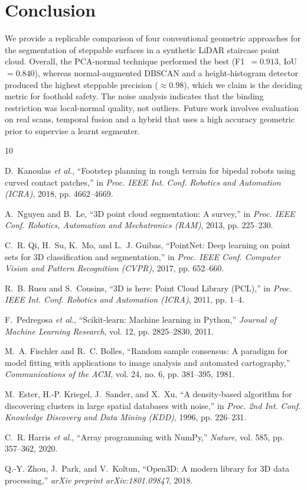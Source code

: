 \documentclass[conference]{IEEEtran}
\begin{document}
\section{Conclusion}
We provide a replicable comparison of four conventional geometric approaches for
the segmentation of steppable surfaces in a synthetic LiDAR staircase point cloud.
Overall, the PCA-normal technique performed the best (F1~$=0.913$, IoU~$=0.840$),
whereas normal-augmented DBSCAN and a height-histogram detector produced the highest
steppable precision ($\approx0.98$), which we claim is the deciding metric for
foothold safety. The noise analysis indicates that the binding restriction was
local-normal quality, not outliers. Future work involves evaluation on real scans,
temporal fusion and a hybrid that uses a high accuracy geometric prior to supervise
a learnt segmenter.

\FloatBarrier

\begin{thebibliography}{10}

D.~Kanoulas \emph{et al.}, ``Footstep planning in rough terrain for bipedal
robots using curved contact patches,'' in \emph{Proc. IEEE Int. Conf. Robotics
and Automation (ICRA)}, 2018, pp. 4662--4669.

A.~Nguyen and B.~Le, ``3D point cloud segmentation: A survey,'' in \emph{Proc.
IEEE Conf. Robotics, Automation and Mechatronics (RAM)}, 2013, pp. 225--230.

C.~R. Qi, H.~Su, K.~Mo, and L.~J. Guibas, ``PointNet: Deep learning on point sets
for 3D classification and segmentation,'' in \emph{Proc. IEEE Conf. Computer
Vision and Pattern Recognition (CVPR)}, 2017, pp. 652--660.

R.~B. Rusu and S.~Cousins, ``3D is here: Point Cloud Library (PCL),'' in
\emph{Proc. IEEE Int. Conf. Robotics and Automation (ICRA)}, 2011, pp. 1--4.

F.~Pedregosa \emph{et al.}, ``Scikit-learn: Machine learning in Python,''
\emph{Journal of Machine Learning Research}, vol. 12, pp. 2825--2830, 2011.

M.~A. Fischler and R.~C. Bolles, ``Random sample consensus: A paradigm for model
fitting with applications to image analysis and automated cartography,''
\emph{Communications of the ACM}, vol. 24, no. 6, pp. 381--395, 1981.

M.~Ester, H.-P. Kriegel, J.~Sander, and X.~Xu, ``A density-based algorithm for
discovering clusters in large spatial databases with noise,'' in \emph{Proc. 2nd
Int. Conf. Knowledge Discovery and Data Mining (KDD)}, 1996, pp. 226--231.

C.~R. Harris \emph{et al.}, ``Array programming with NumPy,'' \emph{Nature}, vol.
585, pp. 357--362, 2020.

Q.-Y. Zhou, J.~Park, and V.~Koltun, ``Open3D: A modern library for 3D data
processing,'' \emph{arXiv preprint arXiv:1801.09847}, 2018.

\end{thebibliography}
\end{document}

